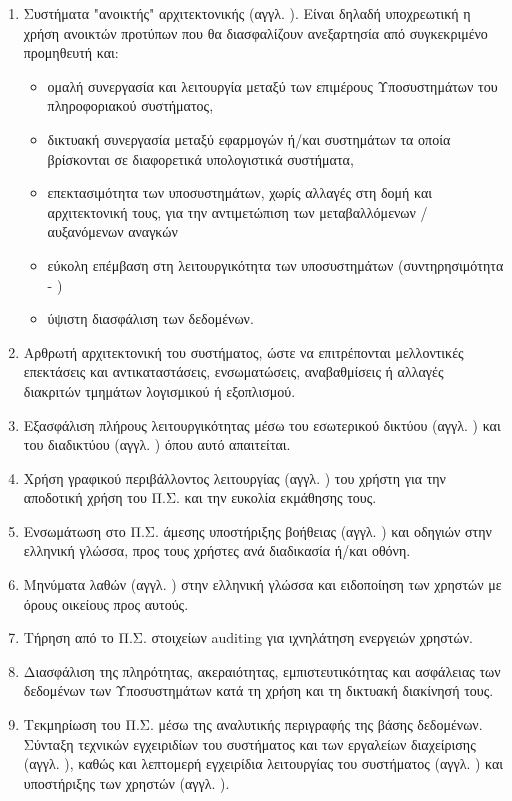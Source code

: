 \documentclass{assignment}
\begin{document}
\begin{enumerate}
\item Συστήματα "ανοικτής" αρχιτεκτονικής (αγγλ. ). Είναι δηλαδή υποχρεωτική η χρήση ανοικτών προτύπων που θα διασφαλίζουν ανεξαρτησία από συγκεκριμένο προμηθευτή και:

  \begin{itemize}
    \item ομαλή συνεργασία και λειτουργία μεταξύ των επιμέρους Υποσυστημάτων του πληροφοριακού συστήματος,
    \item δικτυακή συνεργασία μεταξύ εφαρμογών ή/και συστημάτων τα οποία βρίσκονται σε διαφορετικά υπολογιστικά συστήματα,
    \item επεκτασιμότητα των υποσυστημάτων, χωρίς αλλαγές στη δομή και αρχιτεκτονική τους, για την αντιμετώπιση των μεταβαλλόμενων / αυξανόμενων αναγκών
    \item εύκολη επέμβαση στη λειτουργικότητα των υποσυστημάτων (συντηρησιμότητα - )
    \item ύψιστη διασφάλιση των δεδομένων.
  \end{itemize}

\item Αρθρωτή αρχιτεκτονική του συστήματος, ώστε να επιτρέπονται μελλοντικές επεκτάσεις και αντικαταστάσεις, ενσωματώσεις, αναβαθμίσεις ή αλλαγές διακριτών τμημάτων λογισμικού ή εξοπλισμού.

\item Εξασφάλιση πλήρους λειτουργικότητας μέσω του εσωτερικού δικτύου (αγγλ. ) και του διαδικτύου (αγγλ. ) όπου αυτό απαιτείται.

\item Χρήση γραφικού περιβάλλοντος λειτουργίας (αγγλ. ) του χρήστη για την αποδοτική χρήση του Π.Σ. και την ευκολία εκμάθησης τους.

\item Ενσωμάτωση στο Π.Σ. άμεσης υποστήριξης βοήθειας (αγγλ. ) και οδηγιών στην ελληνική γλώσσα, προς τους χρήστες ανά διαδικασία ή/και οθόνη.

\item Μηνύματα λαθών (αγγλ. ) στην ελληνική γλώσσα και ειδοποίηση των χρηστών με όρους οικείους προς αυτούς.

\item Tήρηση από το Π.Σ. στοιχείων auditing για ιχνηλάτηση
ενεργειών χρηστών.

\item Διασφάλιση της πληρότητας, ακεραιότητας, εμπιστευτικότητας και ασφάλειας των δεδομένων των Υποσυστημάτων κατά τη χρήση και τη δικτυακή διακίνησή τους.

\item Τεκμηρίωση του Π.Σ. μέσω της αναλυτικής περιγραφής της βάσης δεδομένων. Σύνταξη τεχνικών εγχειριδίων του συστήματος και των εργαλείων διαχείρισης (αγγλ. ), καθώς και λεπτομερή εγχειρίδια λειτουργίας του συστήματος (αγγλ.  ) και υποστήριξης των χρηστών (αγγλ. ).

\end{enumerate}
\end{document}
